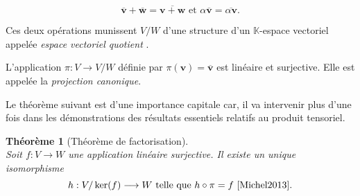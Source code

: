 \documentclass[11pt,a4paper,oneside]{book}
\newtheorem{theo}{Théorème}[chapter]
\def\K{\mathbb K}
\def\v{\mathbf v}
\def\w{\mathbf w}
\begin{document}
\begin{equation}
\overline{\v}+\overline{\w}=\overline{\v+\w}\text{ et }\alpha\overline{\v}=\overline{\alpha \v}.
\end{equation}

Ces deux opérations munissent $ V/W $ d'une structure d'un $ \K $-espace vectoriel appelée \textit{espace vectoriel quotient} \cite[p.50]{hackbusch2012tensor}.

L'application $ \pi :V\longrightarrow V/W $ définie par $\pi(\v) = \overline{\v}$ est linéaire et surjective. Elle est appelée la \textit{projection canonique}. 

Le théorème suivant est d'une importance capitale car, il va intervenir plus d'une fois dans les démonstrations des résultats essentiels relatifs au produit tensoriel.

\begin{theo}[Théorème de factorisation]
	\label{theofact}
	\emph{\\}
	Soit $ f : V\rightarrow W$ une application linéaire surjective. Il existe un unique isomorphisme 
	$$h : V/\ker(f)\longrightarrow W\text{ telle que } h\circ\pi=f \text{ \cite[p.12]{Michel2013}}.$$
\end{theo}
\end{document}
